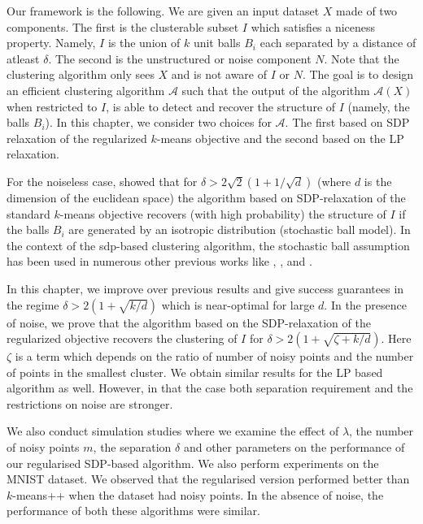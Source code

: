 \documentclass[12pt]{article}
\newcommand{\mc}{\mathcal}
\begin{document}
Our framework is the following. We are given an input dataset $X$ made of two components. The first is the clusterable subset $I$ which satisfies a niceness property. Namely, $I$ is the union of $k$ unit balls $B_i$ each separated by a distance of atleast $\delta$. The second is the unstructured or noise component $N$. Note that the clustering algorithm only sees $X$ and is not aware of $I$ or $N$. The goal is to design an efficient clustering algorithm $\mc A$ such that the output of the algorithm $\mc A(X)$ when restricted to $I$, is able to detect and recover the structure of $I$ (namely, the balls $B_i$). In this chapter, we consider two choices for $\mc A$. The first based on SDP relaxation of the regularized $k$-means objective and the second based on the LP relaxation. 

For the noiseless case, \cite{awasthi2015relax} showed that for $\delta > 2\sqrt{2}(1+1/\sqrt d)$ (where $d$ is the dimension of the euclidean space) the algorithm based on SDP-relaxation of the standard $k$-means objective recovers (with high probability) the structure of $I$ if the balls $B_i$ are generated by an isotropic distribution (stochastic ball model). In the context of the sdp-based clustering algorithm, the stochastic ball assumption has been used in numerous other previous works like \cite{iguchi2015tightness}, \cite{iguchi2017probably}, \cite{awasthi2015relax} and \cite{nellore2015recovery}.

In this chapter, we improve over previous results and give success guarantees in the regime $\delta > 2(1+\sqrt{k/d})$ which is near-optimal for large $d$. In the presence of noise, we prove that the algorithm based on the SDP-relaxation of the regularized objective recovers the clustering of $I$ for $\delta > 2(1+\sqrt{\zeta + k/d})$. Here $\zeta$ is a term which depends on the ratio of number of noisy points and the number of points in the smallest cluster. We obtain similar results for the LP based algorithm as well. However, in that the case both separation requirement and the restrictions on noise are stronger.  

We also conduct simulation studies where we examine the effect of $\lambda$, the number of noisy points $m$, the separation $\delta$ and other parameters on the performance of our regularised SDP-based algorithm. We also perform experiments on the MNIST dataset. We observed that the regularised version performed better than $k$-means++ when the dataset had noisy points. In the absence of noise, the performance of both these algorithms were similar. 
\end{document}
